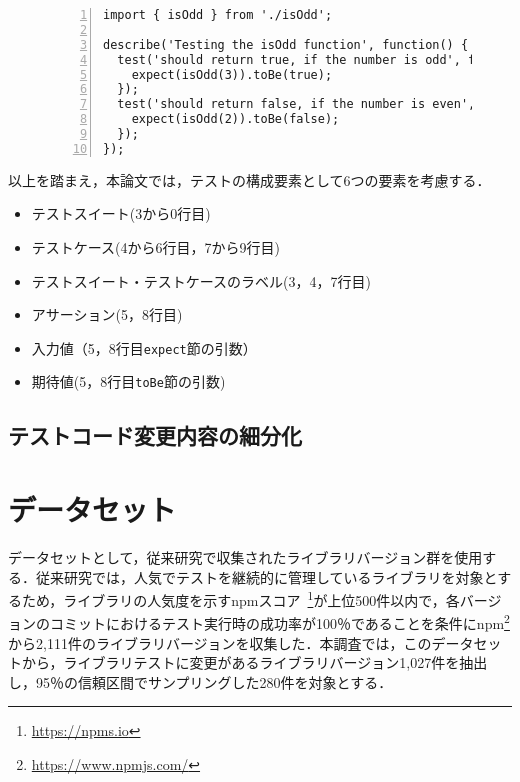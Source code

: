 \documentclass[11pt,dvipdfmx]{jreport}
\begin{document}
\begin{figure}[t]
  \begin{lstlisting}[caption={[upper/lower text]%
    \begin{tabular}[t]{@{}l@{}}
      isOdd.test.js \\[1.0\normalbaselineskip]
    \end{tabular}}, frame={tb}, numbers=left, label=isOdd.test.js, identifierstyle={\small}]
import { isOdd } from './isOdd';

describe('Testing the isOdd function', function() {
  test('should return true, if the number is odd', function() {
    expect(isOdd(3)).toBe(true);
  });
  test('should return false, if the number is even', function() {
    expect(isOdd(2)).toBe(false);
  });
});
  \end{lstlisting}
  \vspace{-6mm}
\end{figure}


以上を踏まえ，本論文では，テストの構成要素として6つの要素を考慮する．
\begin{itemize}
  \setlength{\itemsep}{0cm}
  \item テストスイート(3から0行目)
  \item テストケース(4から6行目，7から9行目)
  \item テストスイート・テストケースのラベル(3，4，7行目)
  \item アサーション(5，8行目)
  \item 入力値（5，8行目{\verb|expect|}節の引数）
  \item 期待値(5，8行目{\verb|toBe|}節の引数)
\end{itemize}

\subsection{テストコード変更内容の細分化}





\section{データセット}
データセットとして，従来研究\cite{matsuda}で収集されたライブラリバージョン群を使用する．従来研究では，人気でテストを継続的に管理しているライブラリを対象とするため，ライブラリの人気度を示すnpmスコア~\footnote{\url{https://npms.io}}が上位500件以内で，各バージョンのコミットにおけるテスト実行時の成功率が100％であることを条件にnpm\footnote{\url{https://www.npmjs.com/}}から2,111件のライブラリバージョンを収集した．本調査では，このデータセットから，ライブラリテストに変更があるライブラリバージョン1,027件を抽出し，95％の信頼区間でサンプリングした280件を対象とする．
\end{document}
